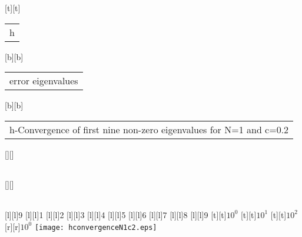 %    
%
%
\begin{psfrags}%
\psfragscanon%
%
[t][t]{\small \setlength{\tabcolsep}{0pt}\begin{tabular}{c}h\end{tabular}}%
[b][b]{\small \setlength{\tabcolsep}{0pt}\begin{tabular}{c}error eigenvalues\end{tabular}}%
[b][b]{\small \setlength{\tabcolsep}{0pt}\begin{tabular}{c}h-Convergence of first nine non-zero eigenvalues for N=1 and c=0.2\end{tabular}}%
[][]{\small \setlength{\tabcolsep}{0pt}\begin{tabular}{c} \end{tabular}}%
[][]{\small \setlength{\tabcolsep}{0pt}\begin{tabular}{c} \end{tabular}}%
[l][l]{\small 9}%
[l][l]{\small 1}%
[l][l]{\small 2}%
[l][l]{\small 3}%
[l][l]{\small 4}%
[l][l]{\small 5}%
[l][l]{\small 6}%
[l][l]{\small 7}%
[l][l]{\small 8}%
[l][l]{\small 9}%
%
[t][t]{\small $10^{0}$}%
[t][t]{\small $10^{1}$}%
[t][t]{\small $10^{2}$}%
%
[r][r]{\small $10^{0}$}%
%
\texttt{[image: hconvergenceN1c2.eps]}%
\end{psfrags}%
%
